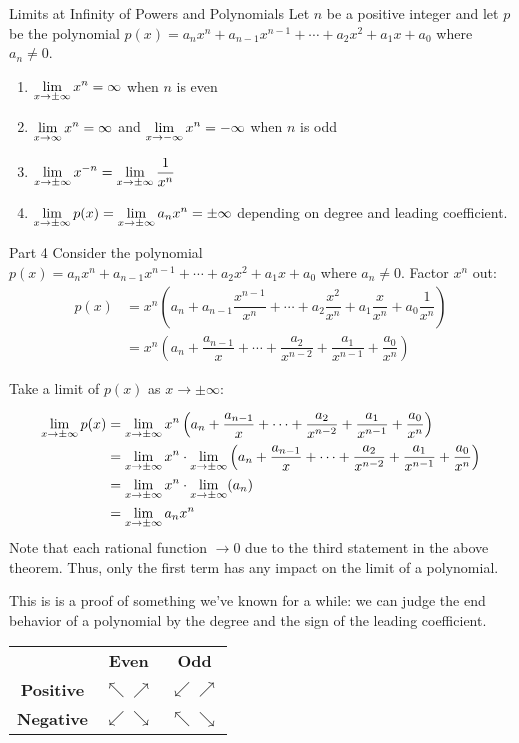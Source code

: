 \begin{thm}{Limits at Infinity of Powers and Polynomials}
Let $n$ be a positive integer and let $p$ be the polynomial $p(x)=a_nx^n+a_{n-1}x^{n-1}+\cdots+a_2x^2+a_1x+a_0$ where $a_n\neq0$.
\begin{enumerate}
  \item $\displaystyle \lim_{x\to\pm\infty}x^n=\infty$ when $n$ is even
  \item $\displaystyle \lim_{x\to\infty}x^n=\infty$ and $\displaystyle \lim_{x\to-\infty}x^n=-\infty$ when $n$ is odd
  \item $\displaystyle \lim_{x\to\pm\infty}x^{-n}=\displaystyle \lim_{x\to\pm\infty}\dfrac{1}{x^n}$
    \item $\displaystyle \lim_{x\to\pm\infty} p(x)=\displaystyle \lim_{x\to\pm\infty} a_nx^n = \pm\infty$ depending on degree and leading coefficient.
  \end{enumerate}
\end{thm}

\begin{prf}{Part 4}
  Consider the polynomial $p(x) =a_nx^n+a_{n-1}x^{n-1}+\cdots+a_2x^2+a_1x+a_0$ where $a_n\neq0$.
  Factor $x^n$ out:
  \begin{align*}
    p(x) &= x^n\left(a_n+a_{n-1}\dfrac{x^{n-1}}{x^n}+ \cdots + a_2\dfrac{x^2}{x^n} + a_1\dfrac{x}{x^n}+a_0\dfrac{1}{x^n}\right)\\
    &= x^n\left(a_n+\dfrac{a_{n-1}}{x}+ \cdots + \dfrac{a_2}{x^{n-2}} + \dfrac{a_1}{x^{n-1}}+\dfrac{a_0}{x^n}\right)
  \end{align*}

  Take a limit of $p(x)$ as $x\to\pm\infty$:

  \begin{align*}
    \displaystyle \lim_{x\to\pm\infty}p(x) & = \displaystyle \lim_{x\to\pm\infty} x^n\left(a_n+\dfrac{a_{n-1}}{x}+ \cdots + \dfrac{a_2}{x^{n-2}} + \dfrac{a_1}{x^{n-1}}+\dfrac{a_0}{x^n}\right)\\
    &= \displaystyle \lim_{x\to\pm\infty} x^n \cdot \displaystyle \lim_{x\to\pm\infty} \left(a_n+\dfrac{a_{n-1}}{x}+ \cdots + \dfrac{a_2}{x^{n-2}} + \dfrac{a_1}{x^{n-1}}+\dfrac{a_0}{x^n}\right)\\
    & =  \displaystyle \lim_{x\to\pm\infty} x^n \cdot \displaystyle \lim_{x\to\pm\infty} (a_n)\\
    & = \displaystyle \lim_{x\to\pm\infty} a_n x^n
  \end{align*}
  Note that each rational function $\to 0$ due to the third statement in the above theorem.
  Thus, only the first term has any impact on the limit of a polynomial.
\end{prf}

This is is a proof of something we've known for a while: we can judge the end behavior of a polynomial by the degree and the sign of the leading coefficient.
\begin{center}
  \begin{tabular}{ccc}
      & \textbf{Even} &   \textbf{Odd}\\
    \textbf{Positive} & $\nwarrow \nearrow$ & $\swarrow \nearrow$\\
    \textbf{Negative} & $\swarrow \searrow$ & $\nwarrow \searrow$
  \end{tabular}
\end{center}


